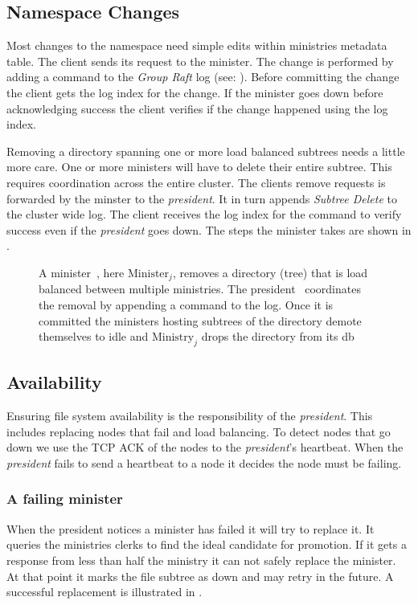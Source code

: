 \subsection*{Namespace Changes}
Most changes to the namespace need simple edits within ministries metadata table. The client sends its request to the minister. The change is performed by adding a command to the \textit{Group Raft} log (see: ). Before committing the change the client gets the log index for the change. If the minister goes down before acknowledging success the client verifies if the change happened using the log index.

Removing a directory spanning one or more load balanced subtrees needs a little more care. One or more ministers will have to delete their entire subtree. This requires coordination across the entire cluster. The clients remove requests is forwarded by the minster to the \textit{president}. It in turn appends \textsl{Subtree Delete} to the cluster wide log. The client receives the log index for the command to verify success even if the \textit{president} goes down. The steps the minister takes are shown in . 
%
\begin{figure}[htbp]
	\centering
	
	\caption{A minister~\amdsLeg{}, here $\text{Minister}_j$, removes a directory (tree) that is load balanced between multiple ministries. The president~\presidentLeg{} coordinates the removal by appending a command to the log. Once it is committed the ministers hosting subtrees of the directory demote themselves to idle and $\text{Ministry}_j$ drops the directory from its db}
	\label{fig:rm}
\end{figure}
%
\subsection{Availability}
Ensuring file system availability is the responsibility of the \textit{president}. This includes replacing nodes that fail and load balancing. To detect nodes that go down we use the TCP ACK of the nodes to the \textit{president}'s \raft{} heartbeat. When the \textit{president} fails to send a \raft{} heartbeat to a node it decides the node must be failing.

\subsubsection*{A failing minister}
When the president notices a minister has failed it will try to replace it. It queries the ministries clerks to find the ideal candidate for promotion. If it gets a response from less than half the ministry it can not safely replace the minister. At that point it marks the file subtree as down and may retry in the future. A successful replacement is illustrated in .

